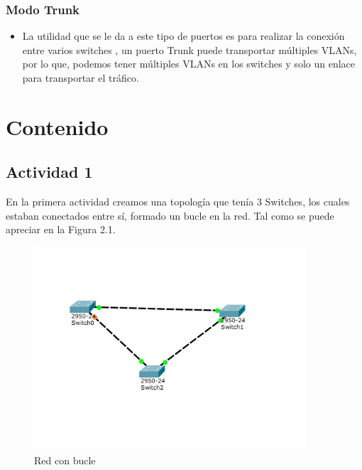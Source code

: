 \documentclass[spanish]{udpreport}
\begin{document}
\subsection{Modo Trunk}
\begin{itemize}
\item La utilidad que se le da a este tipo de puertos es para realizar la conexión entre varios switches , un puerto Trunk puede transportar múltiples VLANs, por lo que, podemos tener múltiples VLANs en los switches y solo un enlace para transportar el tráfico. 
\end{itemize}
\chapter{Contenido}
\section{Actividad 1}
En la primera actividad creamos una topología que tenía 3 Switches, los cuales estaban conectados entre sí, formado un bucle en la red. Tal como se puede apreciar en la Figura 2.1.

\begin{figure}[h!]
	\centering
	\includegraphics[width=0.90\textwidth]{./imagenes/red1}
	\caption{Red con bucle} 
\end{figure}
\vspace{7 cm}
\end{document}
